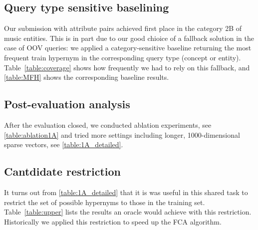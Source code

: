 \documentclass[11pt,a4paper]{article}
\begin{document}



\subsection{Query type sensitive baselining}

Our submission with attribute pairs achieved first place in the category 2B of
music entities. This is in part due to our good chioice of a fallback solution
in the case of OOV queries: we applied a category-sensitive baseline returning
the most frequent train hypernym in the corresponding query type (concept or
entity).  Table~\ref{table:coverage} shows how frequently we had to rely on
this fallback, and \autoref{table:MFH} shows the corresponding baseline
results.



\subsection{Post-evaluation analysis}





After the evaluation closed, we conducted ablation experiments, see
\autoref{table:ablation1A} and 
tried more settings including longer, 1000-dimensional sparse vectors, see
\autoref{table:1A_detailed}.



\subsection{Cantdidate restriction}

It turns out from \autoref{table:1A_detailed} that it is was useful in this
shared task to restrict the set of possible hypernyms to those in the training
set.  Table~\ref{table:upper} lists the results an oracle would achieve with
this restriction. Historically we applied this restriction to speed up the FCA
algorithm.






\end{document}
